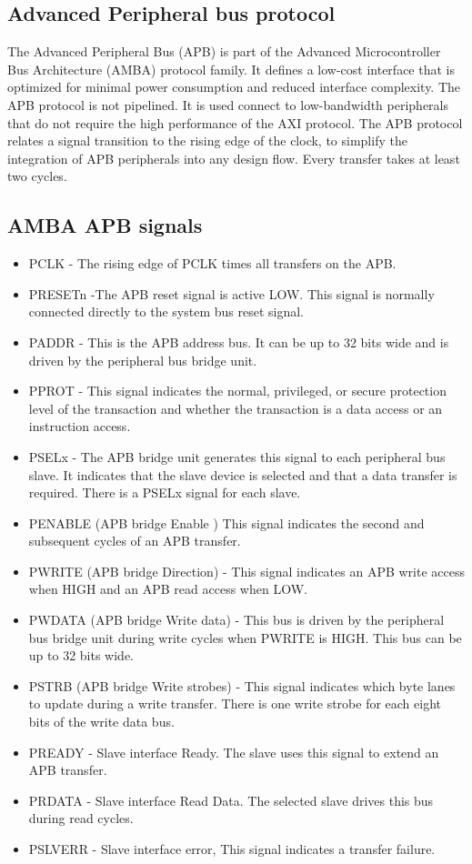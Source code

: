 \documentclass[12pt,a4paper]{report}
\begin{document}
\subsection{Advanced Peripheral bus protocol}

The Advanced Peripheral Bus (APB) is part of the Advanced Microcontroller Bus Architecture (AMBA) protocol family. It defines a low-cost interface that is optimized for minimal power consumption and reduced interface complexity. The APB protocol is not pipelined. It is used connect to low-bandwidth peripherals that do not require the high performance of the AXI protocol. The APB protocol relates a signal transition to the rising edge of the clock, to simplify the integration of APB peripherals into any design flow. Every transfer takes at least two cycles.

\subsection{AMBA APB signals}

\begin{itemize}

\item	PCLK     - The rising edge of PCLK times all transfers on the APB.
\item	PRESETn    -The APB reset signal is active LOW. This signal is normally connected directly to the system bus reset signal.
\item	PADDR   -    This is the APB address bus. It can be up to 32 bits wide and is driven by the peripheral bus bridge unit.
\item	PPROT    -   This signal indicates the normal, privileged, or secure protection level of the transaction and whether the transaction is a data access or an instruction access.
\item	PSELx    -   The APB bridge unit generates this signal to each peripheral bus slave. It indicates that the slave device is selected and that a data transfer is required. There is a PSELx signal for each slave.
\item	PENABLE  (APB bridge Enable ) This signal indicates the second and subsequent cycles of an APB transfer.
\item	PWRITE  (APB bridge Direction) - This signal indicates an APB write access when HIGH and an APB read access when LOW.
\item	PWDATA (APB bridge Write data) - This bus is driven by the peripheral bus bridge unit  during     write  cycles when PWRITE is HIGH. This bus can be up to 32 bits wide.
\item	PSTRB  (APB bridge Write strobes)  - This signal indicates which byte lanes to update during a write transfer. There is one write strobe for each eight bits of the write data bus.
\item	PREADY   -  Slave interface Ready. The slave uses this signal to extend an APB transfer.
\item	PRDATA   -  Slave interface Read Data. The selected slave drives this bus during read cycles.
\item	PSLVERR  -  Slave interface error, This signal indicates a transfer failure.


\end{itemize}
\end{document}
